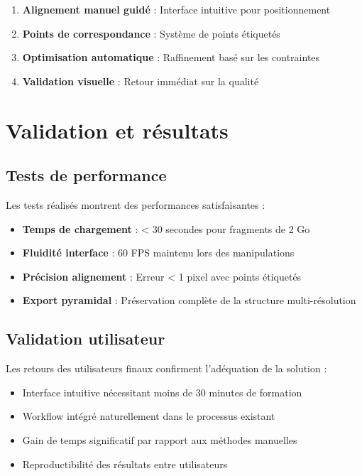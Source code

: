 \documentclass[11pt,a4paper]{report}
\begin{document}
\begin{enumerate}
\item \textbf{Alignement manuel guidé} : Interface intuitive pour positionnement
\item \textbf{Points de correspondance} : Système de points étiquetés
\item \textbf{Optimisation automatique} : Raffinement basé sur les contraintes
\item \textbf{Validation visuelle} : Retour immédiat sur la qualité
\end{enumerate}

\section{Validation et résultats}

\subsection{Tests de performance}

Les tests réalisés montrent des performances satisfaisantes :

\begin{itemize}
\item \textbf{Temps de chargement} : < 30 secondes pour fragments de 2 Go
\item \textbf{Fluidité interface} : 60 FPS maintenu lors des manipulations
\item \textbf{Précision alignement} : Erreur < 1 pixel avec points étiquetés
\item \textbf{Export pyramidal} : Préservation complète de la structure multi-résolution
\end{itemize}

\subsection{Validation utilisateur}

Les retours des utilisateurs finaux confirment l'adéquation de la solution :

\begin{itemize}
\item Interface intuitive nécessitant moins de 30 minutes de formation
\item Workflow intégré naturellement dans le processus existant
\item Gain de temps significatif par rapport aux méthodes manuelles
\item Reproductibilité des résultats entre utilisateurs
\end{itemize}
\end{document}
